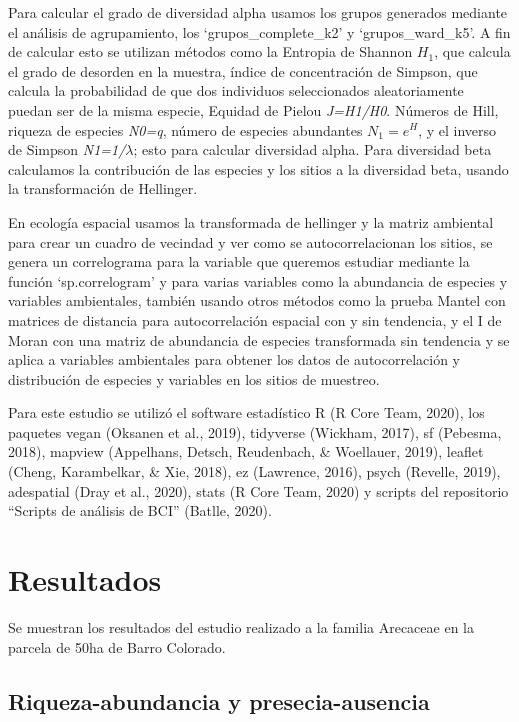 \documentclass[11pt,]{article}
\begin{document}
Para calcular el grado de diversidad alpha usamos los grupos generados
mediante el análisis de agrupamiento, los `grupos\_complete\_k2' y
`grupos\_ward\_k5'. A fin de calcular esto se utilizan métodos como la
Entropia de Shannon \(H_1\), que calcula el grado de desorden en la
muestra, índice de concentración de Simpson, que calcula la probabilidad
de que dos individuos seleccionados aleatoriamente puedan ser de la
misma especie, Equidad de Pielou \emph{J=H1/H0}. Números de Hill,
riqueza de especies \emph{N0=q}, número de especies abundantes
\(N_1=e^H\), y el inverso de Simpson \emph{N1=1/\(\lambda\)}; esto para
calcular diversidad alpha. Para diversidad beta calculamos la
contribución de las especies y los sitios a la diversidad beta, usando
la transformación de Hellinger.

En ecología espacial usamos la transformada de hellinger y la matriz
ambiental para crear un cuadro de vecindad y ver como se
autocorrelacionan los sitios, se genera un correlograma para la variable
que queremos estudiar mediante la función `sp.correlogram' y para varias
variables como la abundancia de especies y variables ambientales,
también usando otros métodos como la prueba Mantel con matrices de
distancia para autocorrelación espacial con y sin tendencia, y el I de
Moran con una matriz de abundancia de especies transformada sin
tendencia y se aplica a variables ambientales para obtener los datos de
autocorrelación y distribución de especies y variables en los sitios de
muestreo.

Para este estudio se utilizó el software estadístico R (R Core Team,
2020), los paquetes vegan (Oksanen et al., 2019), tidyverse (Wickham,
2017), sf (Pebesma, 2018), mapview (Appelhans, Detsch, Reudenbach, \&
Woellauer, 2019), leaflet (Cheng, Karambelkar, \& Xie, 2018), ez
(Lawrence, 2016), psych (Revelle, 2019), adespatial (Dray et al., 2020),
stats (R Core Team, 2020) y scripts del repositorio ``Scripts de
análisis de BCI'' (Batlle, 2020).

\section{Resultados}\label{resultados}

Se muestran los resultados del estudio realizado a la familia Arecaceae
en la parcela de 50ha de Barro Colorado.

\subsection{Riqueza-abundancia y
presecia-ausencia}\label{riqueza-abundancia-y-presecia-ausencia}
\end{document}
